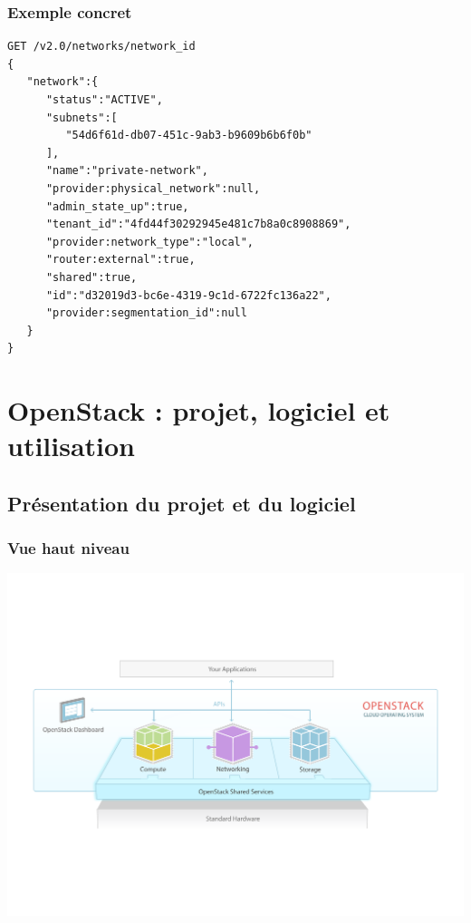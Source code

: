   \begin{frame}[containsverbatim]
    \frametitle{Exemple concret}
\begin{verbatim}
GET /v2.0/networks/network_id
{
   "network":{
      "status":"ACTIVE",
      "subnets":[
         "54d6f61d-db07-451c-9ab3-b9609b6b6f0b"
      ],
      "name":"private-network",
      "provider:physical_network":null,
      "admin_state_up":true,
      "tenant_id":"4fd44f30292945e481c7b8a0c8908869",
      "provider:network_type":"local",
      "router:external":true,
      "shared":true,
      "id":"d32019d3-bc6e-4319-9c1d-6722fc136a22",
      "provider:segmentation_id":null
   }
}
\end{verbatim}
  \end{frame}

  \section[OpenStack]{OpenStack : projet, logiciel et utilisation}

  \subsection[OpenStack]{Présentation du projet et du logiciel}

  \begin{frame}
    \frametitle{Vue haut niveau}
    \includegraphics[width=\textwidth]{images/openstack-software-diagram.pdf}
  \end{frame}

